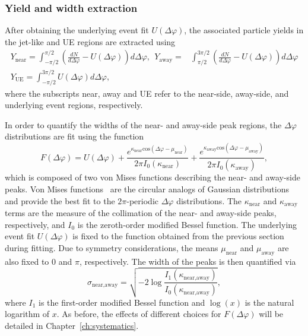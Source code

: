 \subsubsection{Yield and width extraction}
\label{sec:yield_extraction}
 After obtaining the underlying event fit $U(\Delta\varphi)$, the associated particle yields in the jet-like and UE regions are extracted using
\begin{eqnarray}
    Y_{\text{near}} = \int_{-\pi/2}^{\pi/2} (\frac{dN}{d\Delta\varphi}- U(\Delta\varphi))d\Delta\varphi,  \  \ Y_{\text{away}} = & \int_{\pi/2}^{3\pi/2} (\frac{dN}{d\Delta\varphi}- U(\Delta\varphi))d\Delta\varphi 
    \label{eq:jet_yields}
    \\ 
    Y_{\text{UE}} = \int_{-\pi/2}^{3\pi/2} U(\Delta\varphi)d\Delta\varphi,
\label{eq:ue_yield}
\end{eqnarray}
%
where the subscripts near, away and UE refer to the near-side, away-side, and underlying event regions, respectively.

In order to quantify the widths of the near- and away-side peak regions, the $\Delta\varphi$ distributions are fit using the function
%
\begin{equation}
    F(\Delta\varphi) = U(\Delta\varphi) + \frac{e^{\kappa_{\text{near}}\text{cos}(\Delta\varphi - \mu_{\text{near}})}}{2\pi I_0(\kappa_{\text{near}})} + \frac{e^{\kappa_{\text{away}}\text{cos}(\Delta\varphi - \mu_{\text{away}})}}{2\pi I_0(\kappa_{\text{away}})},
\label{eq:fullfit}
\end{equation}
%
which is composed of two von Mises functions describing the near- and away-side peaks. Von Mises functions~\cite{VonMises1, HFWidthPaper} are the circular analogs of Gaussian distributions and provide the best fit to the $2\pi$-periodic $\Delta\varphi$ distributions. The $\kappa_{\text{near}}$ and $\kappa_{\text{away}}$ terms are the measure of the collimation of the near- and away-side peaks, respectively, and $I_{0}$ is the zeroth-order modified Bessel function. The underlying event fit $U(\Delta\varphi)$ is fixed to the function obtained from the previous section during fitting. Due to symmetry considerations, the means $\mu_{\text{near}}$ and  $\mu_{\text{away}}$ are also fixed to $0$ and  $\pi$, respectively. The width of the peaks is then quantified via~\cite{VonMises1}
%
\begin{equation}
    \sigma_{\text{near,away}} = \sqrt{-2\log\frac{I_1(\kappa_{\text{near,away}})}{I_0(\kappa_{\text{near,away}})}},
\label{eq:width}
\end{equation}
%
where $I_1$ is the first-order modified Bessel function and $\log(x)$ is the natural logarithm of $x$. As before, the effects of different choices for $F(\Delta\varphi)$ will be detailed in Chapter~\ref{ch:systematics}.
